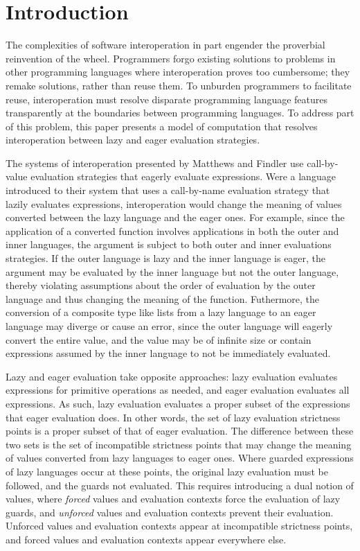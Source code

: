 \section{Introduction}

The complexities of software interoperation in part engender the proverbial reinvention of the wheel. Programmers forgo existing solutions to problems in other programming languages where interoperation proves too cumbersome; they remake solutions, rather than reuse them. To unburden programmers to facilitate reuse, interoperation must resolve disparate programming language features transparently at the boundaries between programming languages. To address part of this problem, this paper presents a model of computation that resolves interoperation between lazy and eager evaluation strategies.

The systems of interoperation presented by Matthews and Findler \cite{matthews07} use call-by-value evaluation strategies that eagerly evaluate expressions. Were a language introduced to their system that uses a call-by-name evaluation strategy that lazily evaluates expressions, interoperation would change the meaning of values converted between the lazy language and the eager ones. For example, since the application of a converted function involves applications in both the outer and inner languages, the argument is subject to both outer and inner evaluations strategies. If the outer language is lazy and the inner language is eager, the argument may be evaluated by the inner language but not the outer language, thereby violating assumptions about the order of evaluation by the outer language and thus changing the meaning of the function. Futhermore, the conversion of a composite type like lists from a lazy language to an eager language may diverge or cause an error, since the outer language will eagerly convert the entire value, and the value may be of infinite size or contain expressions assumed by the inner language to not be immediately evaluated.

Lazy and eager evaluation take opposite approaches: lazy evaluation evaluates expressions for primitive operations as needed, and eager evaluation evaluates all expressions. As such, lazy evaluation evaluates a proper subset of the expressions that eager evaluation does. In other words, the set of lazy evaluation strictness points is a proper subset of that of eager evaluation. The difference between these two sets is the set of incompatible strictness points that may change the meaning of values converted from lazy languages to eager ones. Where guarded expressions of lazy languages occur at these points, the original lazy evaluation must be followed, and the guards not evaluated. This requires introducing a dual notion of values, where \emph{forced} values and evaluation contexts force the evaluation of lazy guards, and \emph{unforced} values and evaluation contexts prevent their evaluation. Unforced values and evaluation contexts appear at incompatible strictness points, and forced values and evaluation contexts appear everywhere else.